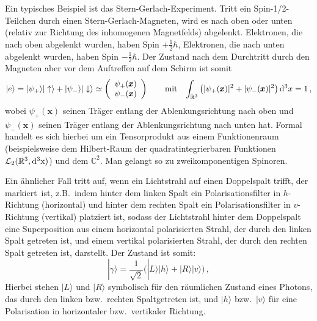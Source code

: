 Ein typisches Beispiel ist das Stern-Gerlach-Experiment. Tritt ein Spin-1/2-Teilchen durch einen
Stern-Gerlach-Magneten, wird es nach oben oder unten (relativ zur Richtung des inhomogenen
Magnetfelds) abgelenkt. Elektronen, die nach oben abgelenkt wurden, haben Spin $+\frac{1}{2}\hbar$,
Elektronen, die nach unten abgelenkt wurden, haben Spin $-\frac{1}{2}\hbar$. Der Zustand
nach dem Durchtritt durch den Magneten aber vor dem Auftreffen auf dem Schirm ist somit
\begin{equation}
        | e \rangle = 
         | \psi_+ \rangle | \uparrow \rangle + | \psi_- \rangle |\downarrow\rangle
        \simeq  \left( \begin{array}{c}  \psi_+(\pmb{x}) \\  \psi_-(\pmb{x})  \end{array} \right) 
        \hspace{0.7cm} {\rm mit} \hspace{0.3cm}
        \int_{\mathbb{R}^3} \big( | \psi_+(\pmb{x})|^2 + |\psi_-(\pmb{x})|^2 \big)\, {\rm d}^3x =1  \, ,  
\end{equation} 
wobei $\psi_+(\pmb{x})$ seinen Tr\"ager entlang der Ablenkungsrichtung 
nach oben und $\psi_-(\pmb{x})$ seinen 
Tr\"ager entlang der Ablenkungsrichtung nach unten hat. Formal handelt es sich hierbei um
ein Tensorprodukt aus einem Funktionenraum (beispielsweise dem Hilbert-Raum der
quadratintegrierbaren Funktionen ${\cal L}_2(\mathbb{R}^3,{\rm d^3 x)}$) und 
dem $\mathbb{C}^2$. Man gelangt so zu zweikomponentigen Spinoren. 

Ein \"ahnlicher Fall tritt auf, wenn ein Lichtstrahl auf einen Doppelspalt trifft, der \glqq markiert\grqq\ ist,
z.B.\ indem hinter dem linken Spalt ein Polarisationsfilter in $h$-Richtung (horizontal) und hinter
dem rechten Spalt ein Polarisationsfilter in $v$-Richtung (vertikal) platziert ist, sodass
der Lichtstrahl hinter dem Doppelspalt eine Superposition aus einem horizontal polarisierten
Strahl, der durch den linken Spalt getreten ist, und einem vertikal polarisierten Strahl, der durch
den rechten Spalt getreten ist, darstellt. Der Zustand ist somit:
\begin{equation}
                  | \gamma \rangle = \frac{1}{\sqrt{2}}\big( |L \rangle | h \rangle + | R \rangle | v\rangle \big) \, ,  
\end{equation} 
Hierbei stehen $|L\rangle$ und $|R\rangle$ symbolisch f\"ur den r\"aumlichen Zustand eines
Photons, das durch den linken bzw.\ rechten Spaltgetreten ist, und
$|h\rangle$ bzw.\ $|v\rangle$ f\"ur eine Polarisation in horizontaler bzw.\ vertikaler Richtung. 

